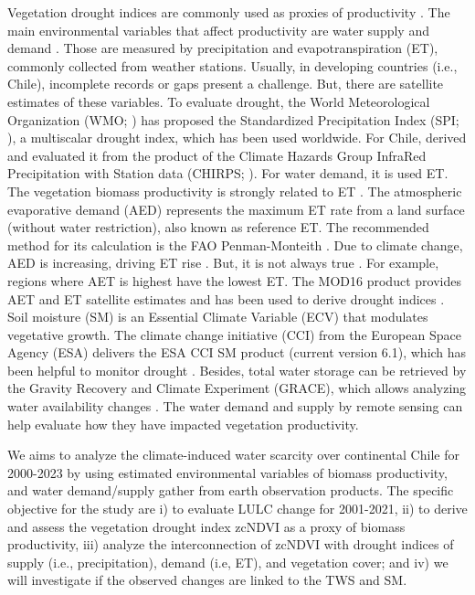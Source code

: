 \documentclass[preprint,
3p]{elsarticle} %
\begin{document}
Vegetation drought indices are commonly used as proxies of productivity
\citep{Paruelo2016, Schucknecht2017}. The main environmental variables
that affect productivity are water supply and demand \citep{Mishra2015}.
Those are measured by precipitation and evapotranspiration (ET),
commonly collected from weather stations. Usually, in developing
countries (i.e., Chile), incomplete records or gaps present a challenge.
But, there are satellite estimates of these variables. To evaluate
drought, the World Meteorological Organization (WMO; \citep{WMO2012})
has proposed the Standardized Precipitation Index (SPI;
\citep{McKee1993}), a multiscalar drought index, which has been used
worldwide. For Chile, \citet{Zambrano2017} derived and evaluated it from
the product of the Climate Hazards Group InfraRed Precipitation with
Station data (CHIRPS; \citep{Funk2015}). For water demand, it is used
ET. The vegetation biomass productivity is strongly related to ET
\citep{FAO66}. The atmospheric evaporative demand (AED) represents the
maximum ET rate from a land surface (without water restriction), also
known as reference ET. The recommended method for its calculation is the
FAO Penman-Monteith \citep{Pereira2015, Allen2005}. Due to climate
change, AED is increasing, driving ET rise \citep{IPCCCH112021}. But, it
is not always true \citep{Milly2016}. For example, regions where AET is
highest have the lowest ET. The MOD16 product
\citep{Running2021, Mu2011} provides AET and ET satellite estimates and
has been used to derive drought indices \citep{Mu2013}. Soil moisture
(SM) is an Essential Climate Variable (ECV) that modulates vegetative
growth. The climate change initiative (CCI) from the European Space
Agency (ESA) delivers the ESA CCI SM product \citep{Dorigo2017} (current
version 6.1), which has been helpful to monitor drought
\citep{Zhang2019}. Besides, total water storage can be retrieved by the
Gravity Recovery and Climate Experiment (GRACE), which allows analyzing
water availability changes \citep{Ahmed2014, Ma2017}. The water demand
and supply by remote sensing can help evaluate how they have impacted
vegetation productivity.

We aims to analyze the climate-induced water scarcity over continental
Chile for 2000-2023 by using estimated environmental variables of
biomass productivity, and water demand/supply gather from earth
observation products. The specific objective for the study are i) to
evaluate LULC change for 2001-2021, ii) to derive and assess the
vegetation drought index zcNDVI as a proxy of biomass productivity, iii)
analyze the interconnection of zcNDVI with drought indices of supply
(i.e., precipitation), demand (i.e, ET), and vegetation cover; and iv)
we will investigate if the observed changes are linked to the TWS and
SM.
\end{document}
